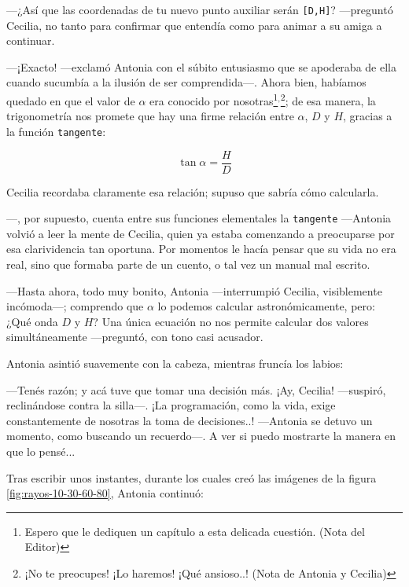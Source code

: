 ---¿Así que las coordenadas de tu nuevo punto auxiliar serán
\texttt{[D,H]}? ---preguntó Cecilia, no tanto para confirmar que
entendía como para animar a su amiga a continuar.

---¡Exacto! ---exclamó Antonia con el súbito entusiasmo que se
apoderaba de ella cuando sucumbía a la ilusión de ser
com\-pren\-di\-da---.  Ahora bien, habíamos quedado en que el valor de
$\alpha$ era conocido por nosotras\footnote{Espero que le dediquen un
  capítulo a esta delicada cuestión. (Nota del
  Editor)}$^,$\footnote{¡No te preocupes!  ¡Lo haremos! ¡Qué
  ansioso..! (Nota de Antonia y Cecilia)}; de esa manera, la
trigonometría nos promete que hay una firme relación entre $\alpha$,
$D$ y $H$, gracias a la función \texttt{tangente}:

\begin{equation}
  \tan \alpha = \frac{H}{D}\label{eq:tangente}
\end{equation}

Cecilia recordaba claramente esa relación; supuso que \openscad{}
sabría cómo calcularla.

---\openscad{}, por supuesto, cuenta entre sus funciones elementales
la \texttt{tangente} ---Antonia volvió a leer la mente de Cecilia,
quien ya estaba comenzando a preocuparse por esa clarividencia tan
oportuna. Por momentos le hacía pensar que su vida no era real, sino
que formaba parte de un cuento, o tal vez un manual mal escrito.

---Hasta ahora, todo muy bonito, Antonia ---interrumpió Cecilia,
visiblemente incómoda---; comprendo que $\alpha$ lo podemos calcular
astronómicamente, pero: ¿Qué onda $D$ y $H$? Una única ecuación no nos
permite calcular dos valores simultáneamente ---preguntó, con tono
casi acusador.

Antonia asintió suavemente con la cabeza, mientras fruncía los
labios:

---Tenés razón; y acá tuve que tomar una decisión más. ¡Ay, Cecilia!
---suspiró, reclinándose contra la silla---.  ¡La programación, como
la vida, exige constantemente de nosotras la toma de decisiones..!
---Antonia se detuvo un momento, como buscando un recuerdo---. A ver
si puedo mostrarte la manera en que lo pensé...

Tras escribir unos instantes, durante los cuales creó las imágenes de
la figura \ref{fig:rayos-10-30-60-80}, Antonia continuó:



